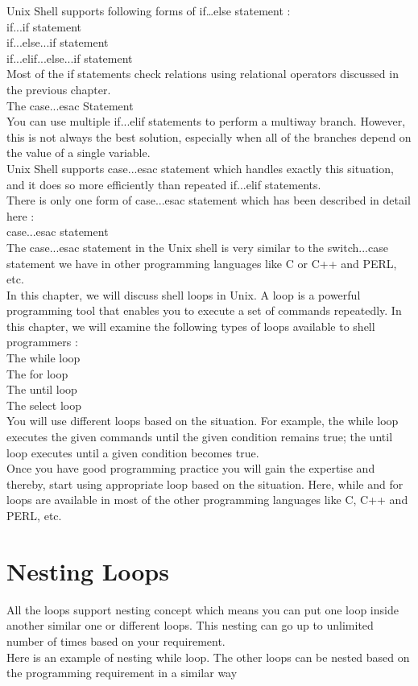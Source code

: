 \documentclass{article}
\begin{document}
Unix Shell supports following forms of if…else statement :\\
    if...if statement\\
    if...else...if statement\\
    if...elif...else...if statement\\
Most of the if statements check relations using relational operators discussed in the previous chapter.\\
The case...esac Statement\\
You can use multiple if...elif statements to perform a multiway branch. However, this is not always the best solution, especially when all of the branches depend on the value of a single variable.\\
Unix Shell supports case...esac statement which handles exactly this situation, and it does so more efficiently than repeated if...elif statements.\\
There is only one form of case...esac statement which has been described in detail here :\\
    case...esac statement\\
The case...esac statement in the Unix shell is very similar to the switch...case statement we have in other programming languages like C or C++ and PERL, etc.\\
In this chapter, we will discuss shell loops in Unix. A loop is a powerful programming tool that enables you to execute a set of commands repeatedly. In this chapter, we will examine the following types of loops available to shell programmers :\\
    The while loop\\
    The for loop\\
    The until loop\\
    The select loop\\
You will use different loops based on the situation. For example, the while loop executes the given commands until the given condition remains true; the until loop executes until a given condition becomes true.\\
Once you have good programming practice you will gain the expertise and thereby, start using appropriate loop based on the situation. Here, while and for loops are available in most of the other programming languages like C, C++ and PERL, etc.

\section*{Nesting Loops}
All the loops support nesting concept which means you can put one loop inside another similar one or different loops. This nesting can go up to unlimited number of times based on your requirement.\\
Here is an example of nesting while loop. The other loops can be nested based on the programming requirement in a similar way 
\end{document}
